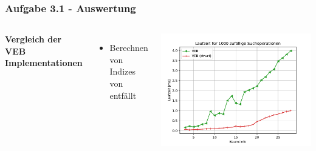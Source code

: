\documentclass[aspectratio=169]{beamer}
\begin{document}


\begin{frame}
	\frametitle{Aufgabe 3.1 - Auswertung}
	\begin{columns}[c] %
		
		\textbf{Vergleich der VEB Implementationen}
		\begin{itemize}
			\item Berechnen von Indizes von entfällt
		\end{itemize}
		
		\includegraphics[scale=.6]{veb_vebstruct.pdf}
		
		
	\end{columns}
	\end{frame}
	
\end{document}
